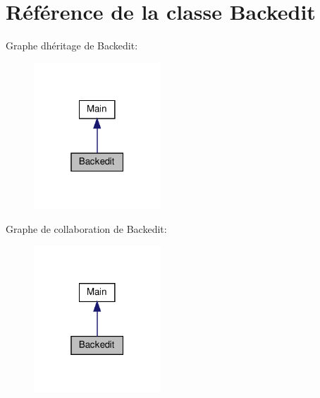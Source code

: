 \hypertarget{class_src_1_1_controllers_1_1_backedit}{}\section{Référence de la classe Backedit}
\label{class_src_1_1_controllers_1_1_backedit}


Graphe d\textquotesingle{}héritage de Backedit\+:\nopagebreak
\begin{figure}[H]
\begin{center}
\leavevmode
\includegraphics[width=135pt]{d2/d90/class_src_1_1_controllers_1_1_backedit__inherit__graph}
\end{center}
\end{figure}


Graphe de collaboration de Backedit\+:\nopagebreak
\begin{figure}[H]
\begin{center}
\leavevmode
\includegraphics[width=135pt]{d0/dbb/class_src_1_1_controllers_1_1_backedit__coll__graph}
\end{center}
\end{figure}
